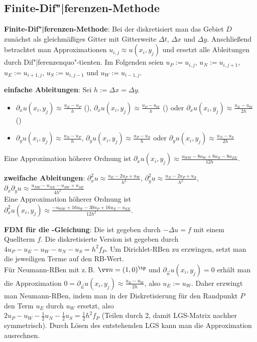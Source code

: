\pagebreak

\subsection{%
    Finite-Dif"|ferenzen-Methode%
}

\textbf{Finite-Dif"|ferenzen-Methode}:
Bei der  diskretisiert man das Gebiet $D$ zunächst
als gleichmäßiges Gitter mit Gitterweite $\Delta t$, $\Delta x$ und $\Delta y$.
Anschließend betrachtet man Approximationen $u_{i,j} \approx u(x_i, y_j)$
und ersetzt alle Ableitungen durch Dif"|ferenzenquo"-tienten.
Im Folgenden seien
$u_P := u_{i,j}$,
$u_N := u_{i,j+1}$,
$u_E := u_{i+1,j}$,
$u_S := u_{i,j-1}$ und
$u_W := u_{i-1,j}$.

\textbf{einfache Ableitungen}:
Sei $h := \Delta x = \Delta y$.
\begin{itemize}
    \item
    $\partial_x u(x_i, y_j) \approx \frac{u_E - u_P}{h}$ (),
    $\partial_x u(x_i, y_j) \approx \frac{u_P - u_W}{h}$ () oder
    $\partial_x u(x_i, y_j) \approx \frac{u_E - u_W}{2h}$ ()
    
    \item
    $\partial_y u(x_i, y_j) \approx \frac{u_N - u_P}{h}$,
    $\partial_y u(x_i, y_j) \approx \frac{u_P - u_S}{h}$ oder
    $\partial_y u(x_i, y_j) \approx \frac{u_N - u_S}{2h}$
\end{itemize}
Eine Approximation höherer Ordnung ist
$\partial_x u(x_i, y_j) \approx \frac{u_{WW} - 8u_W + 8u_E - 8u_{EE}}{12h}$.

\textbf{zweifache Ableitungen}:
$\partial_x^2 u \approx \frac{u_E - 2u_P + u_W}{h^2}$,
$\partial_y^2 u \approx \frac{u_N - 2u_P + u_S}{h^2}$,
$\partial_x \partial_y u \approx \frac{u_{NW} - u_{NE} - u_{SW} + u_{SE}}{4h^2}$\\
Eine Approximation höherer Ordnung ist
$\partial_x^2 u(x_i, y_j) \approx \frac{-u_{WW} + 16u_W - 30u_P + 16u_E - u_{EE}}{12h^2}$.

\linie

\textbf{FDM für die -Gleichung}:
Die  ist gegeben durch $-\Delta u = f$ mit einem Quellterm $f$.
Die diskretisierte Version ist gegeben durch
$4u_P - u_E - u_W - u_N - u_S = h^2 f_P$.
Um Dirichlet-RBen zu erzwingen, setzt man die jeweiligen Terme auf den RB-Wert.\\
Für Neumann-RBen mit z.\,B. $\vec{n} = (1, 0)^\tp$ und $\partial_{\vec{n}} u(x_i, y_j) = 0$
erhält man die Approximation $0 = \partial_{\vec{n}} u(x_i, y_j) \approx \frac{u_E - u_W}{2h}$,
also $u_E := u_W$.
Daher erzwingt man Neumann-RBen, indem man in der Diskretisierung für den Randpunkt $P$
den Term $u_E$ durch $u_W$ ersetzt, also\\
$2u_P - u_W - \frac{1}{2} u_N - \frac{1}{2} u_S = \frac{1}{2} h^2 f_P$
(Teilen durch $2$, damit LGS-Matrix nachher symmetrisch).
Durch Lösen des entstehenden LGS kann man die Approximation ausrechnen.

